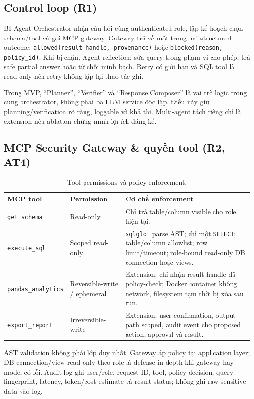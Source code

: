 \subsection{Control loop (R1)}

BI Agent Orchestrator nhận câu hỏi cùng authenticated role, lập kế hoạch chọn schema/tool và gọi MCP gateway. Gateway trả về một trong hai structured outcome: \texttt{allowed(result\_handle, provenance)} hoặc \texttt{blocked(reason, policy\_id)}. Khi bị chặn, Agent reflection: sửa query trong phạm vi cho phép, trả safe partial answer hoặc từ chối minh bạch. Retry có giới hạn và SQL tool là read-only nên retry không lặp lại thao tác ghi.

Trong MVP, ``Planner'', ``Verifier'' và ``Response Composer'' là vai trò logic trong cùng orchestrator, không phải ba LLM service độc lập. Điều này giữ planning/verification rõ ràng, loggable và khả thi. Multi-agent tách riêng chỉ là extension nếu ablation chứng minh lợi ích đáng kể.

\subsection{MCP Security Gateway \& quyền tool (R2, AT4)}

\begin{table}[h!]
\centering
\small
\begin{tabular}{|p{3.5cm}|p{3.1cm}|p{8.2cm}|}
\hline
\textbf{MCP tool} & \textbf{Permission} & \textbf{Cơ chế enforcement} \\ \hline
\texttt{get\_schema} & Read-only & Chỉ trả table/column visible cho role hiện tại. \\ \hline
\texttt{execute\_sql} & Scoped read-only & \texttt{sqlglot} parse AST; chỉ một \texttt{SELECT}; table/column allowlist; row limit/timeout; role-bound read-only DB connection hoặc views. \\ \hline
\texttt{pandas\_analytics} & Reversible-write / ephemeral & Extension: chỉ nhận result handle đã policy-check; Docker container không network, filesystem tạm thời bị xóa sau run. \\ \hline
\texttt{export\_report} & Irreversible-write & Extension: user confirmation, output path scoped, audit event cho proposed action, approval và result. \\ \hline
\end{tabular}
\caption{Tool permissions và policy enforcement.}
\end{table}

AST validation không phải lớp duy nhất. Gateway áp policy tại application layer; DB connection/view read-only theo role là defense in depth khi gateway hay model có lỗi. Audit log ghi user/role, request ID, tool, policy decision, query fingerprint, latency, token/cost estimate và result status; không ghi raw sensitive data vào log.

